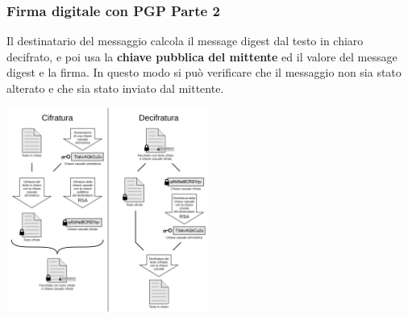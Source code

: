 \begin{frame}
    \frametitle{Firma digitale con PGP Parte 2}
Il destinatario del messaggio calcola il message digest dal testo in chiaro decifrato, e poi usa la \textbf{chiave pubblica del mittente} ed il valore del message digest e la firma.
In questo modo si può verificare che il messaggio non sia stato alterato e che sia stato inviato dal mittente.

\begin{center}
    \includegraphics[width=0.5\textwidth]{img/1-img/PGP_diagram_IT.png}
\end{center}
\end{frame}